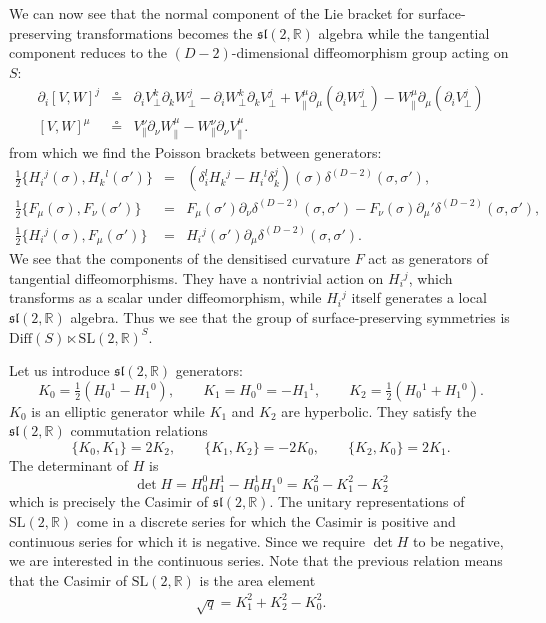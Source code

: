 \documentclass[a4paper,11pt]{article}
\newcommand{\beq}{\begin{eqnarray}}
\newcommand{\eeq}{\end{eqnarray}}
\newcommand{\bea}{\begin{eqnarray}}
\newcommand{\eea}{\end{eqnarray}}
\def\si{{\sigma}}
\newcommand{\R}{\mathbb{R}}
\newcommand{\slr}{\text{SL}(2,\mathbb{R})}
\begin{document}
We can now see that the normal component of the Lie bracket for surface-preserving transformations becomes the $\mathfrak{sl}(2,\mathbb{R})$ algebra while the tangential component reduces to the $(D-2)$-dimensional diffeomorphism group acting on $S$:
\bea
\partial_{i}[V,W]^{j} &\circeq& \partial_{i}{V}^{k}_\perp\partial_{k}{W}^{j}_\perp -\partial_{i}{W}^{k}_\perp \partial_{k} {V}^{j}_\perp
+  V^\mu_\parallel \partial_\mu (\partial_i  W^j_\perp) 
-  W^\mu_\parallel \partial_\mu (\partial_i  V^j_\perp)
\\
{[V,W]}^\mu &\circeq&
{V}^\nu_\parallel\partial_\nu{W}^\mu_\parallel- 
{W}^\nu_\parallel\partial_\nu {V}^\mu_\parallel .
\eea
from which we find the Poisson brackets between generators:
\bea
\tfrac12 \{H_i{}^j(\si),H_k{}^l(\si')\}&=& 
(\delta_i ^l H_k{}^j - H_i{}^l\delta_k^j)(\si)\delta^{(D-2)}(\si,\si'),\\
\tfrac12 \{F_\mu(\si),F_\nu(\si')\}&=& F_\mu(\si') \partial_\nu\delta^{(D-2)}(\si,\si')-
F_\nu(\si) \partial_\mu'\delta^{(D-2)}(\si,\si'), \\
\tfrac12 \{ H_{i}{}^j(\si), F_\mu(\si')\} &=& H_{i}{}^j(\si') \partial_\mu \delta^{(D-2)}(\si,\si').
\eea
We see that the components of the densitised curvature $F$ act as generators of tangential diffeomorphisms. 
They have a nontrivial action on $H_{i}{}^j$, which transforms as a scalar under diffeomorphism, while $H_{i}{}^j$ itself generates a local $\mathfrak{sl}(2,\mathbb{R})$ algebra.
Thus we see that the group of surface-preserving symmetries is $\text{Diff}(S) \ltimes \slr^S$.

Let us introduce $\mathfrak{sl}(2,\R)$ generators:
\begin{equation}
K_0 = \tfrac{1}{2} (H_{0}{}^1 - H_{1}{}^{0}), \qquad K_1 = H_{0}{}^0=-H_1{}^1, \qquad K_2 = \tfrac{1}{2}(H_{0}{}^1 + H_{1}{}^0).
\end{equation}
$K_0$ is an elliptic generator while $K_1$ and $K_2$ are hyperbolic.
They satisfy the $\mathfrak{sl}(2,\R)$ commutation relations
\begin{equation}
\{ K_0, K_1 \} =  2K_2, \qquad \{ K_1, K_2 \} = - 2K_0, \qquad \{ K_2, K_0 \} = 2K_1. 
\end{equation}
The determinant of $H$ is 
\begin{equation}
\det H = H_{0}^0 H_{1}^1 - H_{0}^1H_1{}^0 = K_0^2 - K_1^2 - K_2^2
\end{equation}
which is precisely the Casimir of $\mathfrak{sl}(2,\mathbb{R})$.
The unitary representations of $\slr$ come in a discrete series for which the Casimir is positive and continuous series for which it is negative.
Since we require $\det H$ to be negative, we are interested in the continuous series. Note that the previous relation means that the Casimir of $\slr$ is the area element
 \beq \label{casimir}
 \sqrt{q} = K_1^2+ K_2^2 - K_0^2.
 \eeq
\end{document}

